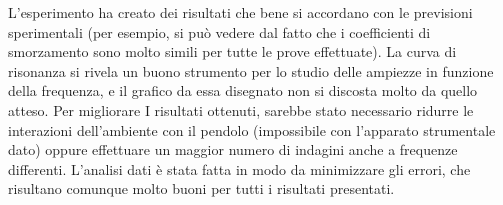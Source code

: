 L'esperimento ha creato dei risultati che bene si accordano con le previsioni sperimentali (per esempio, si può vedere dal fatto
 che i coefficienti di smorzamento sono molto simili per tutte le prove effettuate). La curva di risonanza si rivela un buono
 strumento per lo studio delle ampiezze in funzione della frequenza, e il grafico da essa disegnato non si discosta molto da quello atteso.
  Per migliorare I risultati ottenuti, sarebbe stato necessario ridurre le interazioni dell'ambiente con il pendolo (impossibile con
 l'apparato strumentale dato) oppure effettuare un maggior numero di indagini anche a frequenze differenti.
 L'analisi dati è stata fatta in modo da minimizzare gli errori, che risultano comunque molto buoni per tutti i risultati presentati.
